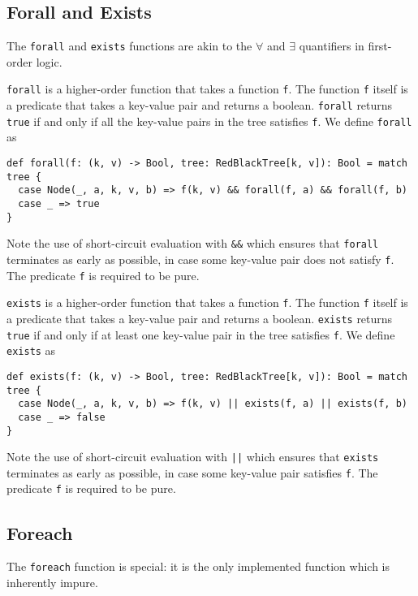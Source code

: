 \documentclass[../main.tex]{subfiles}
\begin{document}
\subsection{Forall and Exists}

The \lstinline{forall} and \lstinline{exists} functions are akin to the $\forall$ and $\exists$ quantifiers in first-order logic.

\lstinline{forall} is a higher-order function that takes a function \lstinline{f}. The function \lstinline{f} itself is a predicate that takes a key-value pair and returns a boolean. \lstinline{forall} returns \lstinline{true} if and only if all the key-value pairs in the tree satisfies \lstinline{f}. We define \lstinline{forall} as
\begin{lstlisting}[language=Flix]
def forall(f: (k, v) -> Bool, tree: RedBlackTree[k, v]): Bool = match tree {
  case Node(_, a, k, v, b) => f(k, v) && forall(f, a) && forall(f, b)
  case _ => true
}
\end{lstlisting}
Note the use of short-circuit evaluation with \lstinline{&&} which ensures that \lstinline{forall} terminates as early as possible, in case some key-value pair does not satisfy \lstinline{f}. The predicate \lstinline{f} is required to be pure.

\lstinline{exists} is a higher-order function that takes a function \lstinline{f}. The function \lstinline{f} itself is a predicate that takes a key-value pair and returns a boolean. \lstinline{exists} returns \lstinline{true} if and only if at least one key-value pair in the tree satisfies \lstinline{f}. We define \lstinline{exists} as
\begin{lstlisting}[language=Flix]
def exists(f: (k, v) -> Bool, tree: RedBlackTree[k, v]): Bool = match tree {
  case Node(_, a, k, v, b) => f(k, v) || exists(f, a) || exists(f, b)
  case _ => false
}
\end{lstlisting}
Note the use of short-circuit evaluation with \lstinline{||} which ensures that \lstinline{exists} terminates as early as possible, in case some key-value pair satisfies \lstinline{f}. The predicate \lstinline{f} is required to be pure.

\subsection{Foreach}

The \lstinline{foreach} function is special: it is the only implemented function which is inherently impure.
\end{document}
